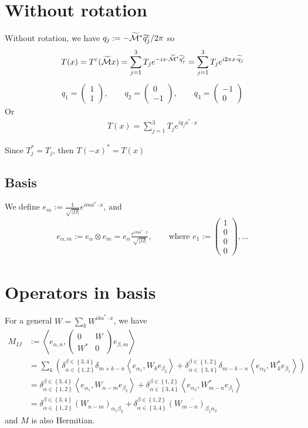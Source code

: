 \documentclass[11pt,a4paper,reqno,french,tikz]{amsart}
\newcommand{\pa}[1]{\left( #1 \right)} %
\newcommand{\acs}[1]{\left\{ #1 \right\}} %
\newcommand{\ab}[1]{\left|#1\right|} %
\newcommand{\ps}[1]{\left< #1 \right>} %
\newcommand{\f}[2]{\frac{#1}{#2}} %
\newcommand{\mat}[1]{\begin{pmatrix} #1 \end{pmatrix}} %
\begin{document}
\section{Without rotation}%

Without rotation, we have $q_j := -\widetilde{\mathcal{M}}^* \widetilde{q}^c_j /2\pi$ so
\begin{align*}
T(x) = T^c(\widetilde{\mathcal{M}} x) = \sum_{j=1}^3 T_j e^{-ix\cdot \widetilde{\mathcal{M}}^* \widetilde{q}_j^c}= \sum_{j=1}^3 T_j e^{i2\pi x\cdot \widetilde{q}_j}
\end{align*}
\begin{align*}
\boxed{q_1 = \mat{1 \\ 1}, \qquad q_{2} = \mat{0 \\ -1}, \qquad q_{3} = \mat{-1 \\ 0}}
\end{align*}
Or
\begin{align*}
\boxed{T(x) = \sum_{j=1}^3 T_j e^{i q_j a^* \cdot x}}
\end{align*}

Since $T_j^* = T_j$, then $T(-x)^* = T(x)$

\subsection{Basis}%
\label{sub:basis}

We define $e_m := \f{1}{\sqrt{\ab{\Omega}}} e^{i m a^* \cdot x}$, and
\begin{align*}
e_{\alpha,m} := e_\alpha \otimes e_m = e_\alpha \f{e^{ima^*\cdot x}}{\sqrt{\ab{\Omega}}}, \qquad \text{where } e_1 := \mat{1 \\ 0 \\ 0 \\ 0},\dots
\end{align*}


\section{Operators in basis}%
\label{sec:operators_in_basis}



For a general $W = \sum_{k} W^{ik a^* \cdot x}$, we have
\begin{align*}
	M_{IJ} & := \ps{e_{\alpha,n}, \mat{0 & W \\ W^* & 0} e_{\beta,m}} \\
	       &= \sum_{k} \pa{\delta_{\alpha \in \acs{1,2}}^{\beta \in \acs{3,4}} \delta_{m+k-n} \ps{e_{\alpha_1},W_k e_{\beta_2}} + \delta_{\alpha \in \acs{3,4}}^{\beta \in \acs{1,2}}\delta_{m-k-n} \ps{e_{\alpha_2},W_k^* e_{\beta_1}}} \\
	       &=   \delta_{\alpha \in \acs{1,2}}^{\beta \in \acs{3,4}}\ps{e_{\alpha_1},W_{n-m} e_{\beta_2}} + \delta_{\alpha \in \acs{3,4}}^{\beta \in \acs{1,2}}\ps{e_{\alpha_2},W_{m-n}^* e_{\beta_1}} \\
	       &=     \delta_{\alpha \in \acs{1,2}}^{\beta \in \acs{3,4}}\pa{W_{n-m}}_{\alpha_1 \beta_2} + \delta_{\alpha \in \acs{3,4}}^{\beta \in \acs{1,2}} \overline{\pa{W_{m-n}}_{\beta_1\alpha_2} }
\end{align*}
and $M$ is also Hermitian.
\end{document}
